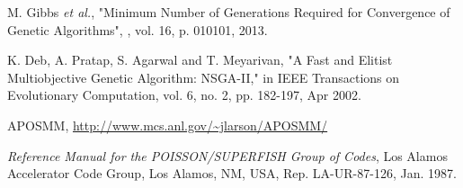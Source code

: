 \documentclass[letterpaper,  %
              ]{jacow-2_3}   %
\begin{document}
\begin{thebibliography}{99}
M. Gibbs \emph{et al.},
"Minimum Number of Generations Required 
for Convergence of Genetic Algorithms",
\emph{}, vol. 16,
p. 010101, 2013.

K. Deb, A. Pratap, S. Agarwal and T. Meyarivan, 
"A Fast and Elitist Multiobjective Genetic Algorithm: NSGA-II," 
in IEEE Transactions on Evolutionary Computation, 
vol. 6, no. 2, pp. 182-197, Apr 2002.

APOSMM, \url{http://www.mcs.anl.gov/~jlarson/APOSMM/}








\emph{Reference Manual for the POISSON/SUPERFISH Group of 
	Codes},  Los Alamos Accelerator Code Group,  
 Los Alamos, NM, USA, 
 Rep. LA-UR-87-126, Jan. 1987.
\end{thebibliography}
\end{document}
